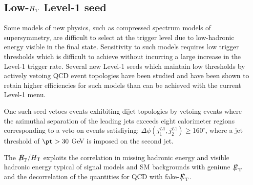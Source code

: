



\subsection{Low-$\mbox{$H_\text{T}$}$ Level-1 seed}

Some models of new physics, such as compressed spectrum models of supersymmetry, are difficult to select at the trigger level due to low-hadronic energy visible in the final state. Sensitivity to such models requires low trigger thresholds which is difficult to achieve without incurring a large increase in the Level-1 trigger rate. Several new Level-1 seeds which maintain low thresholds by actively vetoing QCD event topologies have been studied and have been shown to retain higher efficiencies for such models than can be achieved with the current Level-1 menu.

One such seed vetoes events exhibiting dijet topologies by vetoing events where the azimuthal separation of the leading jets exceeds eight calorimeter regions corresponding to a veto on events satisfiying: $\Delta\phi(j_{1}^{L1},j_{2}^{L1}) \ge 160^{\circ}$, where a jet threshold of $\pt > 30$ GeV is imposed on the second jet.

The $\mht/\scalht$ exploits the correlation in missing hadronic energy and visible hadronic energy typical of signal models and SM backgrounds with geniune $\met$ and the decorrelation of the quantities for QCD with fake-$\met$.

